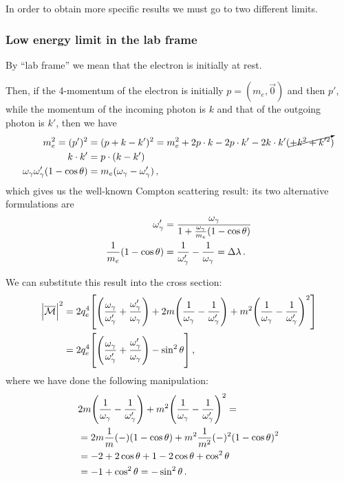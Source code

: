 \documentclass[main.tex]{subfiles}
\begin{document}
In order to obtain more specific results we must go to two different limits. 

\subsubsection{Low energy limit in the lab frame}

By ``lab frame'' we mean that the electron is initially at rest. 

Then, if the 4-momentum of the electron is initially \(p = (m_e, \vec{0})\) and then \(p'\), while the momentum of the incoming photon is \(k\) and that of the outgoing photon is \(k'\), then we have 
%
\begin{align}
m_e^2 = (p')^2 &= (p + k - k')^2 = m_e^2 + 2 p \cdot k - 2 p \cdot k' - 2 k \cdot k' (\cancelto{}{+ k^2 + k^{\prime 2}})  \\
k \cdot k' &= p \cdot (k - k')  \\
\omega_{\gamma } \omega_{\gamma }' (1- \cos \theta ) &= m_e (\omega_{\gamma } - \omega_{\gamma }')
\,,
\end{align}
%
which gives us the well-known Compton scattering result: its two alternative formulations are 
%
\begin{align}
\omega_{\gamma }' &= \frac{\omega_{\gamma }}{1 + \frac{\omega_{\gamma }}{m_e} (1 - \cos \theta )}  \\
\frac{1}{m_e} \qty(1 - \cos \theta ) &= \frac{1}{\omega_{\gamma }'}
- \frac{1}{\omega_{\gamma }} = \Delta \lambda 
\,.
\end{align}

We can substitute this result into the cross section: 
%
\begin{align}
\abs{\mathcal{\overline{M}}}^2 
&= 2 q_e^{4}  \qty[
\qty(
    \frac{\omega_\gamma}{\omega_\gamma'} +
    \frac{\omega_\gamma'}{\omega_\gamma}
)
+ 2 m
\qty(
    \frac{1}{\omega_\gamma} -
    \frac{1}{\omega_\gamma '} 
)
+ m^{2} 
\qty(
    \frac{1}{\omega_\gamma} -
    \frac{1}{\omega_\gamma '} 
)^2  
]  \\
&= 2 q_e^{4} \qty[
\qty(
    \frac{\omega_\gamma}{\omega_\gamma'} +
    \frac{\omega_\gamma'}{\omega_\gamma}
)
-\sin^2\theta 
]
\,,
\end{align}
%
where we have done the following manipulation: 
%
\begin{align}
&2 m
\qty(
    \frac{1}{\omega_\gamma} -
    \frac{1}{\omega_\gamma '} 
)
+ m^2
\qty(
    \frac{1}{\omega_\gamma} -
    \frac{1}{\omega_\gamma '} 
)^2  = \\
&= 2m \frac{1}{m} (-) \qty(1 - \cos \theta )
+ m^2 \frac{1}{m^2} (-)^2 \qty(1 - \cos \theta )^2  \\
&= -2 + 2 \cos \theta + 1 - 2 \cos \theta + \cos^2 \theta   \\
&= - 1 + \cos^2\theta = -\sin^2\theta 
\,.
\end{align}
\end{document}
